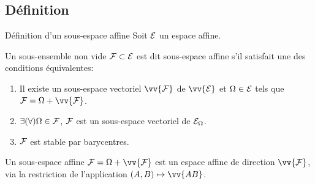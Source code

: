 \documentclass[
bigger]{m53beamer}
\begin{document}
\subsection{Définition}
  \begin{frame}{Définition d'un sous-espace affine}
      Soit $\mathcal{E}$ un espace affine.
      \begin{defprop}
      Un sous-ensemble non vide $\mathcal{F} \subset \mathcal{E}$ est dit \alert{sous-espace affine} s'il satisfait une des conditions équivalentes:
      \begin{enumerate}[<+(1)->]
        \item Il existe un sous-espace vectoriel $\vv{\ens{F}}$ de $\vv{\ens{E}}$ et $\Omega \in \mathcal{E}$ tels que $\ens{F}=\Omega+\vv{\ens{F}}$.
        \item $\exists (\forall)\Omega \in \mathcal{F}$, $\mathcal{F}$ est un sous-espace vectoriel de $\mathcal{E}_{\Omega}$.
        \item $\mathcal{F}$ est stable par barycentres.
      \end{enumerate}
    \end{defprop}\pause
    Un sous-espace affine $\ens{F}=\Omega+\vv{\ens{F}}$ est un espace affine de direction $\vv{\ens{F}}$, via la restriction de l'application $(A,B)\mapsto\vv{AB}$.
  \end{frame}
\end{document}
